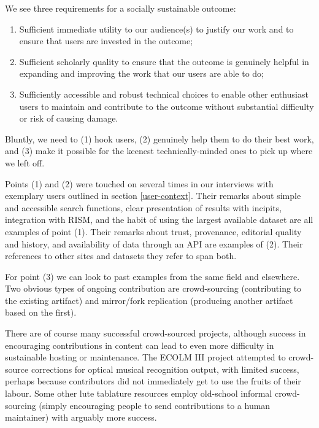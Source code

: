 \documentclass[sigconf, nonacm=true]{acmart}
\begin{document}
\begin{sloppypar}
  We see three requirements for a socially sustainable outcome:

  \begin{enumerate}
  \item Sufficient immediate utility to our audience(s) to justify our
    work and to ensure that users are invested in the outcome;
  \item Sufficient scholarly quality to ensure that the outcome is
    genuinely helpful in expanding and improving the work that our
    users are able to do;
  \item Sufficiently accessible and robust technical choices to enable
    other enthusiast users to maintain and contribute to the outcome
    without substantial difficulty or risk of causing damage.
  \end{enumerate}

  Bluntly, we need to (1) hook users, (2) genuinely help them to do
  their best work, and (3) make it possible for the keenest
  technically-minded ones to pick up where we left off.
  
  Points (1) and (2) were touched on several times in our interviews
  with exemplary users outlined in section \ref{user-context}. Their
  remarks about simple and accessible search functions, clear
  presentation of results with incipits, integration with RISM, and
  the habit of using the largest available dataset are all examples of
  point (1). Their remarks about trust, provenance, editorial quality
  and history, and availability of data through an API are examples of
  (2). Their references to other sites and datasets they refer to span
  both.

  For point (3) we can look to past examples from the same field and
  elsewhere. Two obvious types of ongoing contribution are
  crowd-sourcing (contributing to the existing artifact) and
  mirror/fork replication (producing another artifact based on the
  first).

  There are of course many successful crowd-sourced projects, although
  success in encouraging contributions in content can lead to even
  more difficulty in sustainable hosting or maintenance. The ECOLM III
  project attempted to crowd-source corrections for optical musical
  recognition output, with limited success, perhaps because
  contributors did not immediately get to use the fruits of their
  labour. Some other lute tablature resources employ old-school
  informal crowd-sourcing (simply encouraging people to send
  contributions to a human maintainer) with arguably more success.


\end{sloppypar}
\end{document}

